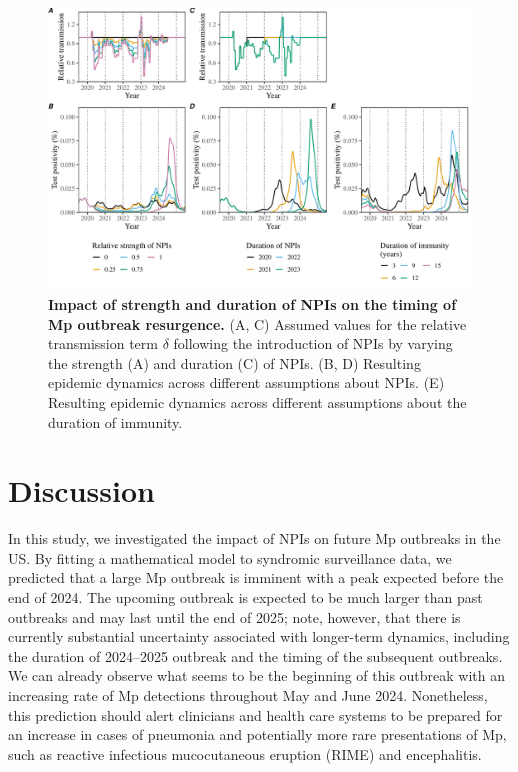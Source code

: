 \documentclass[12pt]{article}
\begin{document}
\begin{figure}[!th]
\includegraphics[width=\textwidth]{../figure3/figure3.pdf}
\caption{
\textbf{Impact of strength and duration of NPIs on the timing of Mp outbreak resurgence.}
(A, C) Assumed values for the relative transmission term $\delta$ following the introduction of NPIs by varying the strength (A) and duration (C) of NPIs.
(B, D) Resulting epidemic dynamics across different assumptions about NPIs.
(E) Resulting epidemic dynamics across different assumptions about the duration of immunity.
}
\end{figure}

\section{Discussion}

In this study, we investigated the impact of NPIs on future Mp outbreaks in the US.
By fitting a mathematical model to syndromic surveillance data, we predicted that a large Mp outbreak is imminent with a peak expected before the end of 2024.
The upcoming outbreak is expected to be much larger than past outbreaks and may last until the end of 2025; note, however, that there is currently substantial uncertainty associated with longer-term dynamics, including the duration of 2024--2025 outbreak and the timing of the subsequent outbreaks.
We can already observe what seems to be the beginning of this outbreak with an increasing rate of Mp detections throughout May and June 2024. 
Nonetheless, this prediction should alert clinicians and health care systems to be prepared for an increase in cases of pneumonia and potentially more rare presentations of Mp, such as reactive infectious mucocutaneous eruption (RIME) and encephalitis.
\end{document}
